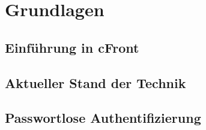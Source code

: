 \chapter{Grundlagen}

\section{Einführung in cFront}

\section{Aktueller Stand der Technik}

\section{Passwortlose Authentifizierung}